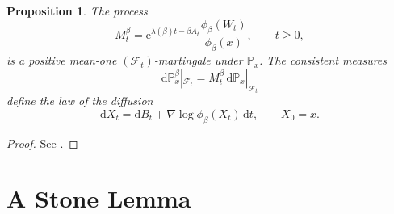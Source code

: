 \documentclass[11pt,reqno]{amsart}
\newtheorem{proposition}[theorem]{Proposition}
\theoremstyle{definition}
\numberwithin{equation}{section}
\newcommand{\<}{\langle}
\renewcommand{\>}{\rangle}
\def\de{{\rm d}}
\def\de{{\mathrm {d}}}
\begin{document}
\begin{appendix}
\begin{proposition}
\label{prop:ground-state-transform-rigorous}
The process
\begin{equation}
 M_t^\beta
 = \mathrm e^{\lambda(\beta)t-\beta A_t}
   \frac{\phi_\beta(W_t)}{\phi_\beta(x)},
 \qquad t\ge0,
 \nonumber
\end{equation}
is a positive mean-one  $(\mathcal F_t) $-martingale under
 $\mathbb P_x $.  The consistent measures
\[
 \de \mathbb P_x^\beta|_{\mathcal F_t}
 =M_t^\beta\,\de \mathbb P_x|_{\mathcal F_t}
\]
define the law of the diffusion
\begin{equation}
 \de X_t=\de B_t+\nabla\log\phi_\beta(X_t)\,\de t,
 \qquad X_0=x.
 \label{eq:ground-state-sde-rigorous}
\end{equation}
\end{proposition}

\begin{proof}
    See \cite[Chapters 4 and 5]{LHB20}.
\end{proof}


\section{A Stone Lemma}


\end{appendix}
\end{document}
